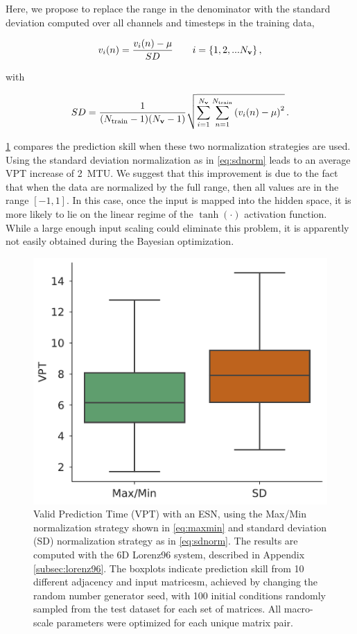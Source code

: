 \documentclass[draft]{agujournal2019}
\begin{document}
Here, we propose to replace the range in the denominator with the
standard deviation computed over all channels and timesteps in the training
data,
\begin{linenomath*}\begin{equation}
    v_i(n) = \dfrac{v_i(n) - \mu}{SD}
    \qquad i = \{1,2, ... N_{\mathbf{v}}\} \, ,
    \label{eq:sdnorm}
\end{equation}\end{linenomath*}
with
\begin{linenomath*}\begin{equation*}
    SD = \dfrac{1}{(N_\text{train}-1)(N_{\mathbf{v}}-1)}
    \sqrt{
        \sum_{i=1}^{N_{\mathbf{v}}}\sum_{n=1}^{N_\text{train}}\left(v_i(n) - \mu\right)^2
    }\, .
\end{equation*}\end{linenomath*}

\cref{fig:data-norm} compares the prediction skill when these two normalization
strategies are used.
Using the standard deviation normalization as in \cref{eq:sdnorm} leads to an
average VPT increase of 2~MTU.
We suggest that this improvement is due to the fact that when the data are
normalized by the full range, then all values are in the range $[-1,1]$.
In this case, once the input is mapped into the hidden space, it is more likely
to lie on the linear regime of the $\tanh(\cdot)$ activation function.
While a large enough input scaling could eliminate this problem, it is
apparently not easily obtained during the Bayesian optimization.

\begin{figure}
    \centering
    \includegraphics[width=.6\textwidth]{figures/data-normalization.pdf}
    \caption{Valid Prediction Time (VPT) with an ESN, using the
        Max/Min normalization strategy shown in \cref{eq:maxmin} and standard
        deviation (SD)
        normalization strategy as in \cref{eq:sdnorm}.
        The results are computed with the 6D Lorenz96 system, described in
        Appendix \cref{subsec:lorenz96}.
        The boxplots indicate prediction skill from 10 different adjacency and
        input matricesm, achieved by changing the random number generator seed,
        with 100 initial conditions randomly sampled from the test dataset for
        each set of matrices.
        All macro-scale parameters were optimized for each unique matrix pair.
    }
    \label{fig:data-norm}
\end{figure}
\end{document}

